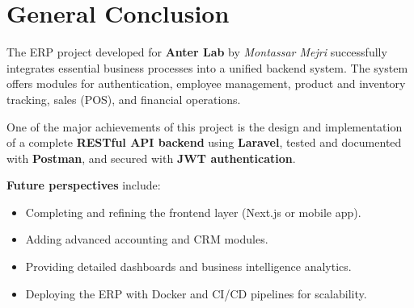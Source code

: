 \section*{General Conclusion}

The ERP project developed for \textbf{Anter Lab} by \textit{Montassar Mejri} successfully integrates essential business processes into a unified backend system. The system offers modules for authentication, employee management, product and inventory tracking, sales (POS), and financial operations.

One of the major achievements of this project is the design and implementation of a complete \textbf{RESTful API backend} using \textbf{Laravel}, tested and documented with \textbf{Postman}, and secured with \textbf{JWT authentication}.

\textbf{Future perspectives} include:
\begin{itemize}
    \item Completing and refining the frontend layer (Next.js or mobile app).
    \item Adding advanced accounting and CRM modules.
    \item Providing detailed dashboards and business intelligence analytics.
    \item Deploying the ERP with Docker and CI/CD pipelines for scalability.
\end{itemize}